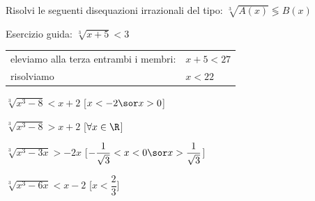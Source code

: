 \begin{esercizio}\label{ese:03.1}
Risolvi le seguenti disequazioni irrazionali del tipo:
\(\sqrt[3]{A(x)} \lessgtr B(x)\)

Esercizio guida: \(\sqrt[3]{x +5} < 3\)
\begin{center}
\begin{tabular}{ll}
eleviamo alla terza entrambi i membri: & \(x +5 < 27\)\\
risolviamo & \(x < 22\)
\end{tabular}
\end{center}

\begin{enumeratea}
\item \(\sqrt[3]{x^3 -8} < x +2 \)
\hfill [\(x<-2 \sor x>0\)]
\item \(\sqrt[3]{x^3 -8} > x +2 \)
\hfill [\(\forall x \in \R\)]
\item \(\sqrt[3]{x^3 -3x} > -2x \)
\hfill [\(-\dfrac{1}{\sqrt{3}}<x<0 \sor x>\dfrac{1}{\sqrt{3}}\)]
\item \(\sqrt[3]{x^3 -6x} < x -2 \)
\hfill [\(x< \dfrac{2}{3}\)]
\end{enumeratea}
\end{esercizio}

